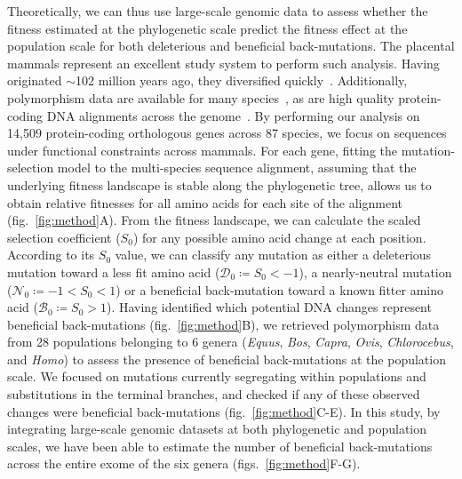 \documentclass[12pt]{article}
\newcommand{\Sphy}{S_{0}}
\newcommand{\SphyDel}{\mathcal{D}_0}
\newcommand{\SphyNeu}{\mathcal{N}_0}
\newcommand{\SphyBen}{\mathcal{B}_0}
\begin{document}
Theoretically, we can thus use large-scale genomic data to assess whether the fitness estimated at the phylogenetic scale predict the fitness effect at the population scale for both deleterious and beneficial back-mutations.
The placental mammals represent an excellent study system to perform such analysis.
Having originated $\sim$102 million years ago, they diversified quickly~\cite{foley_genomic_2023}.
Additionally, polymorphism data are available for many species~\cite{howe_ensembl_2021}, as are high quality protein-coding DNA alignments across the genome~\cite{scornavacca_orthomam_2019}.
By performing our analysis on 14,509 protein-coding orthologous genes across 87 species, we focus on sequences under functional constraints across mammals.
For each gene, fitting the mutation-selection model to the multi-species sequence alignment, assuming that the underlying fitness landscape is stable along the phylogenetic tree, allows us to obtain relative fitnesses for all amino acids for each site of the alignment (fig.~\ref{fig:method}A).
From the fitness landscape, we can calculate the scaled selection coefficient ($\Sphy$) for any possible amino acid change at each position.
According to its $\Sphy$ value, we can classify any mutation as either a deleterious mutation toward a less fit amino acid ($\SphyDel \coloneqq \Sphy < -1$), a nearly-neutral mutation ($\SphyNeu \coloneqq -1 < \Sphy <1$) or a beneficial back-mutation toward a known fitter amino acid ($\SphyBen \coloneqq \Sphy > 1$).
Having identified which potential DNA changes represent beneficial back-mutations (fig.~\ref{fig:method}B), we retrieved polymorphism data from 28 populations belonging to 6 genera (\textit{Equus}, \textit{Bos}, \textit{Capra}, \textit{Ovis}, \textit{Chlorocebus}, and \textit{Homo}) to assess the presence of beneficial back-mutations at the population scale.
We focused on mutations currently segregating within populations and substitutions in the terminal branches, and checked if any of these observed changes were beneficial back-mutations (fig.~\ref{fig:method}C-E).
In this study, by integrating large-scale genomic datasets at both phylogenetic and population scales, we have been able to estimate the number of beneficial back-mutations across the entire exome of the six genera (figs.~\ref{fig:method}F-G).
\end{document}
